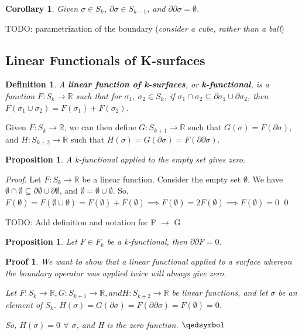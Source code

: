 \documentclass{book}
\newtheorem{defn}[equation]{Definition}
\newtheorem{coro}[equation]{Corollary}
\newtheorem{prop}[equation]{Proposition}
\newtheorem{prf}[equation]{Proof}
\renewenvironment{proof}{\emph{Proof}.}{\qed}
\begin{document}
\begin{coro}
	Given $\sigma \in S_k$, $\partial\sigma \in S_{k-1}$, and $\partial\partial\sigma = \emptyset$. 
\end{coro}

TODO: parametrization of the boundary (\emph{consider a cube, rather than a ball})

\subsection{Linear Functionals of K-surfaces}


\begin{defn}
	A \textbf{linear function of k-surfaces}, or \textbf{k-functional}, is a function $F : S_k \to \mathbb{R}$ such that for $\sigma_1$, $\sigma_2 \in S_k$, if $\sigma_1 \cap \sigma_2 \subseteq \partial\sigma_1 \cup \partial\sigma_2$, then $F(\sigma_1\cup\sigma_2) = F(\sigma_1) + F(\sigma_2)$. 
\end{defn}


Given $F : S_k \to \mathbb{R}$, we can then define $G : S_{k+1} \to \mathbb{R}$ such that $G(\sigma) = F(\partial\sigma)$, and $H : S_{k+2} \to \mathbb{R}$ such that $H(\sigma) = G(\partial\sigma) = F(\partial\partial\sigma)$. 

\begin{prop}
	A k-functional applied to the empty set gives zero. 
\end{prop}
\begin{proof}
	Let $F : S_k \to \mathbb{R}$ be a linear function. Consider the empty set $\emptyset$. 
We have $\emptyset \cap \emptyset \subseteq \partial\emptyset \cup \partial\emptyset$, and $\emptyset = \emptyset\cup\emptyset$. 
So, $F(\emptyset) = F(\emptyset\cup\emptyset) = F(\emptyset) + F(\emptyset) \implies F(\emptyset) = 2F(\emptyset) \implies F(\emptyset) = 0$
\end{proof}

TODO: Add definition and notation for F $\to$ G

\begin{prop}
	Let $F \in F_k$ be a k-functional, then $\partial\partial F = 0 $.
\end{prop}
\begin{prf}
	We want to show that a linear functional applied to a surface whereon the boundary operator was applied twice will always give zero.
	
	Let $F : S_k \to \mathbb{R}, G : S_{k+1} \to \mathbb{R}, and H : S_{k+2} \to \mathbb{R}$ be linear functions, and let $\sigma$ be an element of $S_k$. $H(\sigma) = G(\partial\sigma) = F(\partial\partial\sigma) = F(\emptyset) = 0$. 
	
	So, $H(\sigma) = 0$ $\forall$ $\sigma$, and H is the zero function. 
	$\qedsymbol$
\end{prf}
\end{document}
